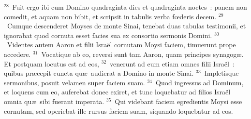 ${}^{28}$~Fuit ergo ibi cum Domino quadraginta dies et quadraginta noctes~: panem non comedit, et aquam non bibit, et scripsit in tabulis verba fœderis decem.
${}^{29}$~Cumque descenderet Moyses de monte Sinai, tenebat duas tabulas testimonii, et ignorabat quod cornuta esset facies sua ex consortio sermonis Domini.
${}^{30}$~Videntes autem Aaron et filii Isra\"el cornutam Moysi faciem, timuerunt prope accedere.
${}^{31}$~Vocatique ab eo, reversi sunt tam Aaron, quam principes synagog\ae . Et postquam locutus est ad eos,
${}^{32}$~venerunt ad eum etiam omnes filii Isra\"el~: quibus pr\ae cepit cuncta qu\ae\ audierat a Domino in monte Sinai.
${}^{33}$~Impletisque sermonibus, posuit velamen super faciem suam.
${}^{34}$~Quod ingressus ad Dominum, et loquens cum eo, auferebat donec exiret, et tunc loquebatur ad filios Isra\"el omnia qu\ae\ sibi fuerant imperata.
${}^{35}$~Qui videbant faciem egredientis Moysi esse cornutam, sed operiebat ille rursus faciem suam, siquando loquebatur ad eos.

